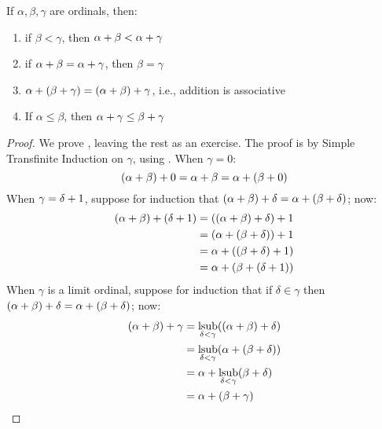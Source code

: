 \documentclass[../../../include/open-logic-section]{subfiles}
\begin{document}
\begin{lem}
If $\alpha, \beta, \gamma$ are ordinals, then:
\begin{enumerate}
	\item{} if $\beta < \gamma$, then $\alpha
	+  \beta < \alpha +  \gamma$
	\item{} if $\alpha +  \beta =
	\alpha+ \gamma$, then $\beta = \gamma$
	\item{}  $\alpha +  (\beta +
	\gamma) = (\alpha +  \beta) +  \gamma$, i.e.,
	addition is associative
	\item{}  If $\alpha \leq \beta$, then $\alpha
	+  \gamma \leq \beta + \gamma$
\end{enumerate}
\end{lem}

\begin{proof}
We prove , leaving the rest as an exercise. The
proof is by Simple Transfinite Induction on $\gamma$, using
. When $\gamma = 0$:
\[
(\alpha +  \beta) +  0 = \alpha +  \beta  = \alpha +  (\beta +  0)
\]
When $\gamma = \delta+ 1$, suppose for induction that $(\alpha
+  \beta) +  \delta = \alpha +  (\beta +
\delta)$; now:
\begin{align*}
	(\alpha \ordplus  \beta) \ordplus  (\delta \ordplus  1) & = ((\alpha \ordplus  \beta) \ordplus  \delta)\ordplus 1\\
	& = (\alpha \ordplus  (\beta \ordplus  \delta)) \ordplus  1\\
	& = \alpha \ordplus  ((\beta \ordplus  \delta)\ordplus 1)\\
	& = \alpha \ordplus  (\beta \ordplus  (\delta\ordplus 1))
\end{align*}	
When $\gamma$ is a limit ordinal, suppose for induction that if
$\delta \in \gamma$ then $(\alpha +  \beta) +  \delta =
\alpha +  (\beta +  \delta)$; now:
\begin{align*}
	(\alpha \ordplus  \beta) \ordplus  \gamma & = \supstrict_{\delta < \gamma}((\alpha \ordplus  \beta) \ordplus  \delta) \\
	&= \supstrict_{\delta < \gamma}(\alpha \ordplus  (\beta \ordplus  \delta))\\
	&= \alpha \ordplus  \supstrict_{\delta < \gamma}(\beta \ordplus  \delta)\\
	& = \alpha \ordplus  (\beta \ordplus  \gamma)
\end{align*}
\end{proof}
\end{document}
